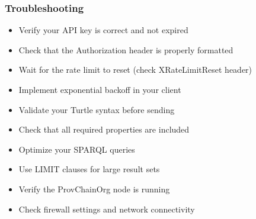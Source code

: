 \documentclass[letterpaper,10pt,english]{sphinxmanual}
\begin{document}
\subsubsection{Troubleshooting}
\label{\detokenize{api/rest-api:troubleshooting}}\begin{description}
\begin{itemize}
\item {} 
\sphinxAtStartPar
Verify your API key is correct and not expired

\item {} 
\sphinxAtStartPar
Check that the Authorization header is properly formatted

\end{itemize}

\begin{itemize}
\item {} 
\sphinxAtStartPar
Wait for the rate limit to reset (check X\sphinxhyphen{}RateLimit\sphinxhyphen{}Reset header)

\item {} 
\sphinxAtStartPar
Implement exponential backoff in your client

\end{itemize}

\begin{itemize}
\item {} 
\sphinxAtStartPar
Validate your Turtle syntax before sending

\item {} 
\sphinxAtStartPar
Check that all required properties are included

\end{itemize}

\begin{itemize}
\item {} 
\sphinxAtStartPar
Optimize your SPARQL queries

\item {} 
\sphinxAtStartPar
Use LIMIT clauses for large result sets

\end{itemize}

\begin{itemize}
\item {} 
\sphinxAtStartPar
Verify the ProvChainOrg node is running

\item {} 
\sphinxAtStartPar
Check firewall settings and network connectivity

\end{itemize}

\end{description}
\end{document}
